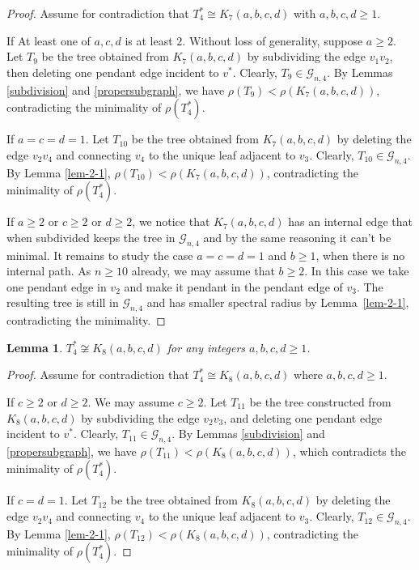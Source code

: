 \documentclass[12pt]{amsart}
\newtheorem{lem}{Lemma}[section]
\begin{document}
\begin{proof}
	Assume for contradiction that $T_4^* \cong K_7(a,b,c,d)$ with $a,b,c,d \ge 1$.
	
	If At least one of $a,c,d$ is at least $2$.
	Without loss of generality, suppose $a \ge 2$.
	Let $T_{9}$ be the tree obtained from $K_7(a,b,c,d)$ by subdividing the edge $v_1v_2$, then deleting one pendant edge incident to $v^*$.
	Clearly, $T_{9} \in \mathcal{G}_{n,4}$.
	By Lemmas \ref{subdivision} and \ref{propersubgraph}, we have $\rho(T_{9}) < \rho(K_7(a,b,c,d))$, contradicting the minimality of $\rho(T_4^*)$.
	
	If $a = c = d = 1$.
	Let $T_{10}$ be the tree obtained from $K_7(a,b,c,d)$ by deleting the edge $v_2v_4$ and connecting $v_4$ to the unique leaf adjacent to $v_3$.
	Clearly, $T_{10} \in \mathcal{G}_{n,4}$.
	By Lemma \ref{lem-2-1}, $\rho(T_{10}) < \rho(K_7(a,b,c,d))$, contradicting the minimality of $\rho(T_4^*)$.
	
	If $a\geq 2$ or $c\geq 2$ or $d\geq 2$, we notice that $K_7(a,b,c,d)$ has an internal edge that when subdivided keeps the tree in $\mathcal{G}_{n,4}$ and by the same reasoning it can't be minimal. It remains to study the case $a=c=d=1$ and $b\geq 1$, when there is no internal path. As $n\geq 10$ already, we may assume that $b\geq 2$. In this case we take one pendant edge in $v_2$ and make it pendant in the pendant edge of $v_3$. The resulting tree is still in $\mathcal{G}_{n,4}$ and has smaller spectral radius by Lemma~\ref{lem-2-1}, contradicting the minimality. 
\end{proof}


\begin{lem}\label{lem-3.14}
	$T_4^* \not\cong K_8(a,b,c,d)$ for any integers $a,b,c,d \ge 1$.
\end{lem}

\begin{proof}
	Assume for contradiction that $T_4^* \cong K_8(a,b,c,d)$ where $a,b,c,d \ge 1$.
	
	If $c \ge 2$ or $d \ge 2$. We may assume $c\geq 2$.
	Let $T_{11}$ be the tree constructed from $K_8(a,b,c,d)$ by subdividing the edge $v_2v_3$, and deleting one pendant edge incident to $v^*$.
	Clearly, $T_{11} \in \mathcal{G}_{n,4}$.
	By Lemmas \ref{subdivision} and \ref{propersubgraph}, we have $\rho(T_{11}) < \rho(K_8(a,b,c,d))$, which contradicts the minimality of $\rho(T_4^*)$.
	
	If $c = d = 1$.
	Let $T_{12}$ be the tree obtained from $K_8(a,b,c,d)$ by deleting the edge $v_2v_4$ and connecting $v_4$ to the unique leaf adjacent to $v_3$.
	Clearly, $T_{12} \in \mathcal{G}_{n,4}$.
	By Lemma \ref{lem-2-1}, $\rho(T_{12}) < \rho(K_8(a,b,c,d))$, contradicting the minimality of $\rho(T_4^*)$.
\end{proof}
\end{document}
